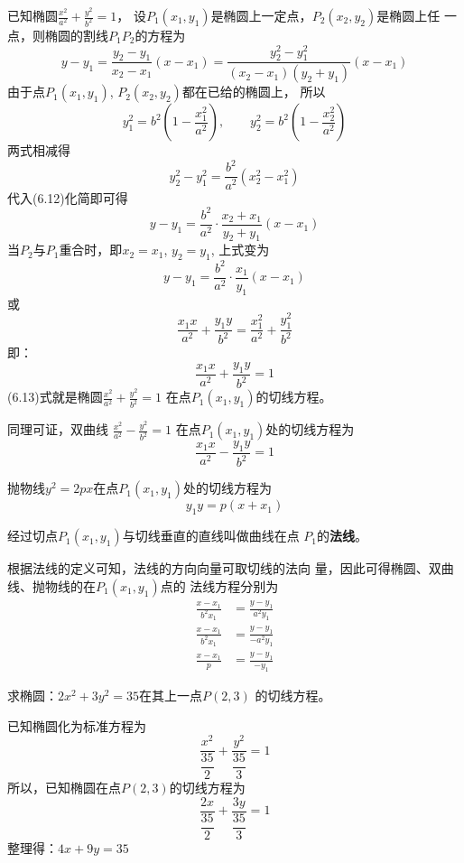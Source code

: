 已知椭圆$\frac{x^2}{a^2}+\frac{y^2}{b^2}=1$，
设$P_1(x_1,y_1)$是椭圆上一定点，$P_2(x_2,y_2)$是椭圆上任
一点，则椭圆的割线$P_1P_2$的方程为
\begin{equation}
    y-y_1=\frac{y_2-y_1}{x_2-x_1}(x-x_1)=\frac{y^2_2-y^2_1}{(x_2-x_1)(y_2+y_1)}(x-x_1)
\end{equation}
由于点$P_1(x_1,y_1)$, $P_2(x_2,y_2)$都在已给的椭圆上，
所以
\[y^2_1=b^2\left(1-\frac{x^2_1}{a^2}\right),\qquad y^2_2=b^2\left(1-\frac{x^2_2}{a^2}\right)\]
两式相减得
\[y_2^2-y_1^2=\frac{b^2}{a^2}(x^2_2-x^2_1)\]
代入(6.12)化简即可得
\[y-y_1=\frac{b^2}{a^2}\cdot \frac{x_2+x_1}{y_2+y_1}(x-x_1)\]
当$P_2$与$P_1$重合时，即$x_2=x_1$, $y_2=y_1$, 上式变为
\[y-y_1=\frac{b^2}{a^2}\cdot \frac{x_1}{y_1}(x-x_1)\]
或
\[\frac{x_1x}{a^2}+\frac{y_1y}{b^2}=\frac{x_1^2}{a^2}+\frac{y_1^2}{b^2}\]
即：
\begin{equation}
    \boxed{\frac{x_1x}{a^2}+\frac{y_1y}{b^2}=1}
\end{equation}
(6.13)式就是椭圆$\frac{x^2}{a^2}+\frac{y^2}{b^2}=1$
在点$P_1(x_1,y_1)$的切线方程。

同理可证，双曲线
$\frac{x^2}{a^2}-\frac{y^2}{b^2}=1$
在点$P_1(x_1,y_1)$处的切线方程为
\begin{equation}
    \boxed{\frac{x_1x}{a^2}-\frac{y_1y}{b^2}=1}
\end{equation}

抛物线$y^2=2px$在点$P_1(x_1,y_1)$处的切线方程为
\begin{equation}
    \boxed{y_1y=p(x+x_1)}
\end{equation}

经过切点$P_1(x_1,y_1)$与切线垂直的直线叫做曲线在点
$P_1$的\textbf{法线}。

根据法线的定义可知，法线的方向向量可取切线的法向
量，因此可得椭圆、双曲线、抛物线的在$P_1(x_1,y_1)$点的
法线方程分别为
\begin{align}
    \frac{x-x_1}{b^2x_1}&=\frac{y-y_1}{a^2y_1}\\
    \frac{x-x_1}{b^2x_1}&=\frac{y-y_1}{-a^2y_1}\\
    \frac{x-x_1}{p}&=\frac{y-y_1}{-y_1}
\end{align}


\begin{example}
    求椭圆：$2x^2+3y^2=35$在其上一点$P(2,3)$
的切线方程。
\end{example}

\begin{solution}
    已知椭圆化为标准方程为
\[\frac{x^2}{\dfrac{35}{2}}+\frac{y^2}{\dfrac{35}{3}}=1\]
所以，已知椭圆在点$P(2,3)$的切线方程为
\[\frac{2x}{\dfrac{35}{2}}+\frac{3y}{\dfrac{35}{3}}=1\]
整理得：$4x+9y=35$
\end{solution}

